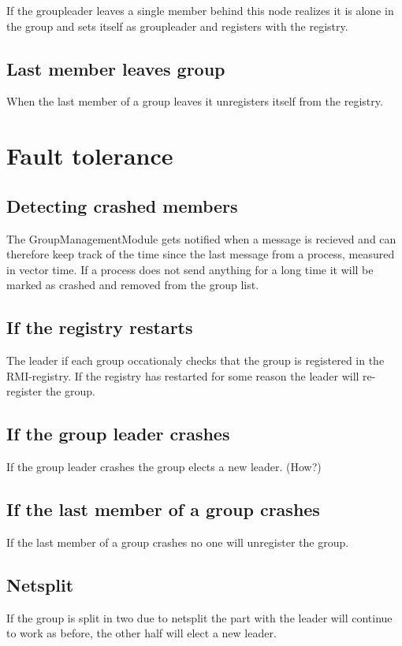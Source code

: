 \documentclass[11pt,swedish]{article}
\begin{document}
If the groupleader leaves a single member behind this node realizes it is alone in the group and sets itself as groupleader and registers with the registry.

\subsection{Last member leaves group}
When the last member of a group leaves it unregisters itself from the registry.

\section{Fault tolerance}

\subsection{Detecting crashed members}
The GroupManagementModule gets notified when a message is recieved and can therefore keep track of the time since the last message from a process, measured in vector time. If a process does not send anything for a long time it will be marked as crashed and removed from the group list.

\subsection{If the registry restarts}
The leader if each group occationaly checks that the group is registered in the RMI-registry. If the registry has restarted for some reason the leader will re-register the group.

\subsection{If the group leader crashes}
If the group leader crashes the group elects a new leader. (How?)

\subsection{If the last member of a group crashes}
If the last member of a group crashes no one will unregister the group. 

\subsection{Netsplit}
If the group is split in two due to netsplit the part with the leader will continue to work as before, the other half will elect a new leader.
\end{document}
